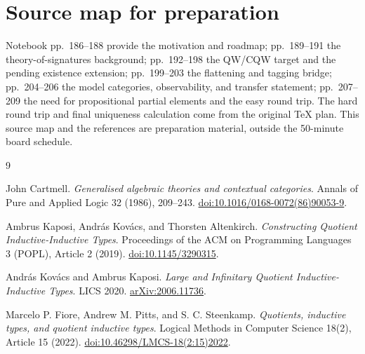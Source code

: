 \documentclass[11pt]{article}
\begin{document}
\section*{Source map for preparation}

Notebook pp.~186--188 provide the motivation and roadmap; pp.~189--191 the
theory-of-signatures background; pp.~192--198 the QW/CQW target and the
pending existence extension; pp.~199--203 the flattening and tagging bridge;
pp.~204--206 the model categories, observability, and transfer statement;
pp.~207--209 the need for propositional partial elements and the easy round
trip. The hard round trip and final uniqueness calculation come from the
original TeX plan. This source map and the references are preparation
material, outside the 50-minute board schedule.

\begin{thebibliography}{9}

John Cartmell.
\emph{Generalised algebraic theories and contextual categories}.
Annals of Pure and Applied Logic 32 (1986), 209--243.
\href{https://doi.org/10.1016/0168-0072(86)90053-9}{doi:10.1016/0168-0072(86)90053-9}.

Ambrus Kaposi, Andr\'as Kov\'acs, and Thorsten Altenkirch.
\emph{Constructing Quotient Inductive-Inductive Types}.
Proceedings of the ACM on Programming Languages 3 (POPL), Article 2 (2019).
\href{https://doi.org/10.1145/3290315}{doi:10.1145/3290315}.

Andr\'as Kov\'acs and Ambrus Kaposi.
\emph{Large and Infinitary Quotient Inductive-Inductive Types}.
LICS 2020.
\href{https://arxiv.org/abs/2006.11736}{arXiv:2006.11736}.

Marcelo P. Fiore, Andrew M. Pitts, and S. C. Steenkamp.
\emph{Quotients, inductive types, and quotient inductive types}.
Logical Methods in Computer Science 18(2), Article 15 (2022).
\href{https://doi.org/10.46298/LMCS-18(2:15)2022}{doi:10.46298/LMCS-18(2:15)2022}.

\end{thebibliography}
\end{document}
